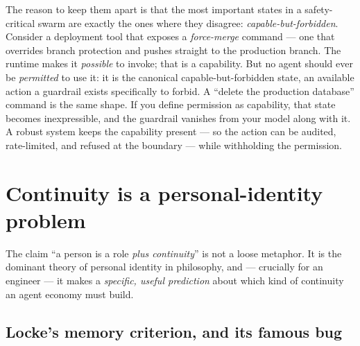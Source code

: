\documentclass[11pt,a4paper]{article}
\theoremstyle{definition}
\begin{document}
\noindent The reason to keep them apart is that the most important states in a
safety-critical swarm are exactly the ones where they disagree:
\emph{capable-but-forbidden}. Consider a deployment tool that exposes a
\emph{force-merge} command --- one that overrides branch protection and pushes
straight to the production branch. The runtime makes it \emph{possible} to invoke;
that is a capability. But no agent should ever be \emph{permitted} to use it: it is
the canonical capable-but-forbidden state, an available action a guardrail exists
specifically to forbid. A ``delete the production database'' command is the same
shape. If you define permission as capability, that state becomes inexpressible,
and the guardrail vanishes from your model along with it. A robust system keeps the
capability present --- so the action can be audited, rate-limited, and refused at
the boundary --- while withholding the permission.


\pdexercisepointer{\ref{ex:stp-capability-states}}{\ref{ex:stp-ought-implies-can}}{\pageref{ex:stp-capability-states}}

\section{Continuity is a personal-identity problem}\label{sec:continuity}

The claim ``a person is a role \emph{plus continuity}'' is not a loose metaphor.
It is the dominant theory of personal identity in philosophy, and --- crucially
for an engineer --- it makes a \emph{specific, useful prediction} about which kind
of continuity an agent economy must build.

\ifdefined\pdreflectionplate{}\fi
\subsection{Locke's memory criterion, and its famous bug}
\end{document}
